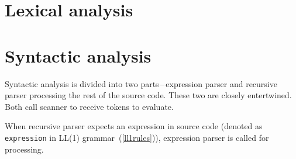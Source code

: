 \documentclass[a4paper, 11pt]{article}
\begin{document}
\section{Lexical analysis}\label{sec:LEX}

\section{Syntactic analysis}\label{sec:SYNTACTIC}
Syntactic analysis is divided into two parts\,--\,expression parser and
recursive parser processing the rest of the source code. These two are closely entertwined.
Both call scanner to receive tokens to evaluate.\par
When recursive parser expects an expression in source code (denoted as \verb|expression| in LL(1) grammar~(\ref{ll1rules})), 
expression parser is called for processing.
\end{document}
